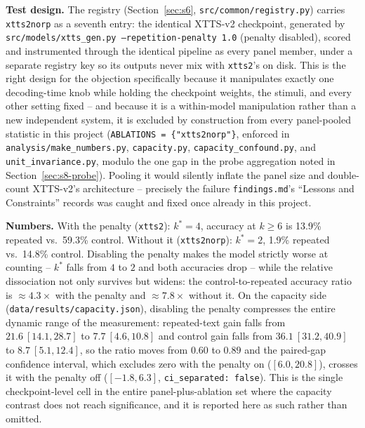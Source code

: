 \documentclass[11pt]{article}
\begin{document}
\textbf{Test design.} The registry (Section~\ref{sec:s6},
\texttt{src/common/registry.py}) carries \texttt{xtts2norp} as a seventh
entry: the identical XTTS-v2 checkpoint, generated by
\texttt{src/models/xtts\_gen.py --repetition-penalty 1.0} (penalty disabled),
scored and instrumented through the identical pipeline as every panel member,
under a separate registry key so its outputs never mix with \texttt{xtts2}'s
on disk. This is the right design for the objection specifically because it
manipulates exactly one decoding-time knob while holding the checkpoint
weights, the stimuli, and every other setting fixed -- and because it is a
within-model manipulation rather than a new independent system, it is
excluded by construction from every panel-pooled statistic in this project
(\texttt{ABLATIONS = \{"xtts2norp"\}}, enforced in
\texttt{analysis/make\_numbers.py}, \texttt{capacity.py},
\texttt{capacity\_confound.py}, and \texttt{unit\_invariance.py}, modulo the
one gap in the probe aggregation noted in Section~\ref{sec:s8-probe}).
Pooling it would silently inflate the panel size and double-count XTTS-v2's
architecture -- precisely the failure \texttt{findings.md}'s ``Lessons and
Constraints'' records was caught and fixed once already in this project.

\textbf{Numbers.} With the penalty (\texttt{xtts2}): $k^\ast=4$,
accuracy at $k\ge6$ is 13.9\% repeated vs.\ 59.3\% control.
Without it (\texttt{xtts2norp}): $k^\ast=2$, 1.9\%
repeated vs.\ 14.8\% control. Disabling the penalty makes the model
strictly worse at counting -- $k^\ast$ falls from $4$ to $2$ and both
accuracies drop -- while the relative dissociation not only survives but
widens: the control-to-repeated accuracy ratio is $\approx4.3\times$ with the
penalty and $\approx7.8\times$ without it. On the capacity side
(\texttt{data/results/capacity.json}), disabling the penalty compresses the
entire dynamic range of the measurement: repeated-text gain falls from
$21.6\ [14.1,28.7]$ to $7.7\ [4.6,10.8]$ and control gain falls from $36.1\
[31.2,40.9]$ to $8.7\ [5.1,12.4]$, so the ratio moves from $0.60$ to $0.89$
and the paired-gap confidence interval, which excludes zero with the penalty
on ($[6.0,20.8]$), crosses it with the penalty off ($[-1.8,6.3]$,
\texttt{ci\_separated: false}). This is the single checkpoint-level cell in
the entire panel-plus-ablation set where the capacity contrast does not reach
significance, and it is reported here as such rather than omitted.
\end{document}
